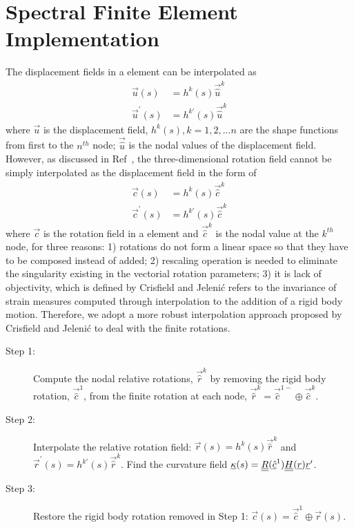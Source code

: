 \section{Spectral Finite Element Implementation}
The displacement fields in a element can be interpolated as
\begin{align}
    \label{InterpolateDisp}
    \vec{u}(s) &= h^k(s) \vec{\hat{u}}^k \\
    \label{InterpolateDispp}
    \vec{u}^\prime(s) &= h^{k\prime}(s) \vec{\hat{u}}^k
\end{align}
where $\vec{u}$ is the displacement field, $h^k(s), k=1,2,...n$ are the
shape functions from first to the $n^{th}$ node; $\vec{\hat{u}}$ is the
nodal values of the displacement field. However, as discussed in Ref~\cite{Bauchau-etal:2009}, the three-dimensional rotation field cannot be
simply interpolated as the displacement field in the form of
\begin{align}
    \label{InterpolateRot}
    \vec{c}(s) &= h^k(s) \vec{\hat{c}}^k \\
    \label{InterpolateRotp}
    \vec{c}^\prime(s) &= h^{k \prime}(s) \vec{\hat{c}}^k 
\end{align}    
where $\vec{c}$ is the rotation field in a element and $\vec{\hat{c}}^k$ is
the nodal value at the $k^{th}$ node, for three reasons: 1) rotations do not
form a linear space so that they have to be composed instead of added; 2)
rescaling operation is needed to eliminate the singularity existing in the
vectorial rotation parameters; 3) it is lack of objectivity, which is
defined by Crisfield and Jeleni\'c\cite{Crisfield1999} refers
to the invariance of strain measures computed through interpolation to the
addition of a rigid body motion. Therefore, we adopt a more robust
interpolation approach proposed by Crisfield and Jeleni\'c
\cite{Crisfield1999} to deal with the finite rotations.
\begin{description}
    \item[Step 1:] Compute the nodal relative rotations, $\vec{\hat{r}}^k$ by removing the rigid body rotation, $\vec{\hat{c}}^1$, from the finite rotation at each node, $\vec{\hat{r}}^k = \vec{\hat{c}}^{1-} \oplus \vec{\hat{c}}^k$.
    \item[Step 2:] Interpolate the relative rotation field: $\vec{r}(s) = h^k(s) \vec{\hat{r}}^k$ and $\vec{r}^\prime(s) = h^{k \prime}(s) \vec{\hat{r}}^k$. Find the curvature field $\underline{\kappa}(s) = \underline{\underline{R}}(\underline{\hat{c}}^1) \underline{\underline{H}}(\underline{r}) \underline{r}^\prime$.
    \item[Step 3:] Restore the rigid body rotation removed in Step 1: $\vec{c}(s) = \vec{\hat{c}}^1 \oplus \vec{r}(s)$.
\end{description} 
